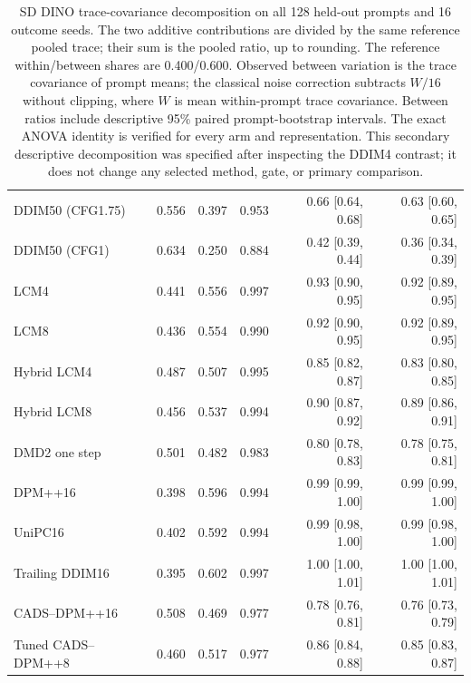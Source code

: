 \begin{table}[t]
\begin{tabular}{lrrrrr}
DDIM50 (CFG1.75) & 0.556 & 0.397 & 0.953 & 0.66 [0.64, 0.68] & 0.63 [0.60, 0.65] \\
DDIM50 (CFG1) & 0.634 & 0.250 & 0.884 & 0.42 [0.39, 0.44] & 0.36 [0.34, 0.39] \\
LCM4 & 0.441 & 0.556 & 0.997 & 0.93 [0.90, 0.95] & 0.92 [0.89, 0.95] \\
LCM8 & 0.436 & 0.554 & 0.990 & 0.92 [0.90, 0.95] & 0.92 [0.89, 0.95] \\
Hybrid LCM4 & 0.487 & 0.507 & 0.995 & 0.85 [0.82, 0.87] & 0.83 [0.80, 0.85] \\
Hybrid LCM8 & 0.456 & 0.537 & 0.994 & 0.90 [0.87, 0.92] & 0.89 [0.86, 0.91] \\
DMD2 one step & 0.501 & 0.482 & 0.983 & 0.80 [0.78, 0.83] & 0.78 [0.75, 0.81] \\
DPM++16 & 0.398 & 0.596 & 0.994 & 0.99 [0.99, 1.00] & 0.99 [0.99, 1.00] \\
UniPC16 & 0.402 & 0.592 & 0.994 & 0.99 [0.98, 1.00] & 0.99 [0.98, 1.00] \\
Trailing DDIM16 & 0.395 & 0.602 & 0.997 & 1.00 [1.00, 1.01] & 1.00 [1.00, 1.01] \\
CADS--DPM++16 & 0.508 & 0.469 & 0.977 & 0.78 [0.76, 0.81] & 0.76 [0.73, 0.79] \\
Tuned CADS--DPM++8 & 0.460 & 0.517 & 0.977 & 0.86 [0.84, 0.88] & 0.85 [0.83, 0.87] \\
\bottomrule
\end{tabular}
\caption{SD DINO trace-covariance decomposition on all 128 held-out prompts and 16 outcome seeds. The two additive contributions are divided by the same reference pooled trace; their sum is the pooled ratio, up to rounding. The reference within/between shares are 0.400/0.600. Observed between variation is the trace covariance of prompt means; the classical noise correction subtracts $W/16$ without clipping, where $W$ is mean within-prompt trace covariance. Between ratios include descriptive 95\% paired prompt-bootstrap intervals. The exact ANOVA identity is verified for every arm and representation. This secondary descriptive decomposition was specified after inspecting the DDIM4 contrast; it does not change any selected method, gate, or primary comparison.}
\label{tab:test_anova}
\end{table}

